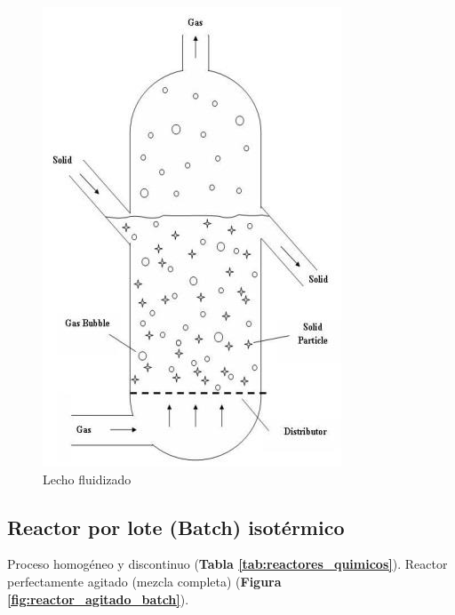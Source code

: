 \begin{multicols}{3}
    \begin{figure}
        \centering
        \includegraphics[width=\textwidth]{img/esquemas/reactor_lecho_fluidizado.png}
        \caption{Lecho fluidizado}
        \label{fig:reactor_lecho_fluidizado}
    \end{figure}
\end{multicols}
    
    \subsection{Reactor por lote (Batch) isotérmico}
    
    Proceso homogéneo y discontinuo (\textbf{Tabla \ref{tab:reactores_quimicos}}). Reactor perfectamente agitado (mezcla completa) (\textbf{Figura \ref{fig:reactor_agitado_batch}}).
    
